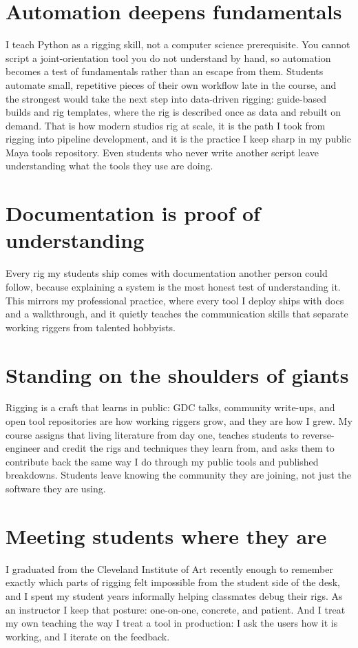 \documentclass[10pt,a4paper]{article}
\begin{document}
\section{Automation deepens fundamentals}
I teach Python as a rigging skill, not a computer science prerequisite. You cannot script a joint-orientation tool you do not understand by hand, so automation becomes a test of fundamentals rather than an escape from them. Students automate small, repetitive pieces of their own workflow late in the course, and the strongest would take the next step into data-driven rigging: guide-based builds and rig templates, where the rig is described once as data and rebuilt on demand. That is how modern studios rig at scale, it is the path I took from rigging into pipeline development, and it is the practice I keep sharp in my public Maya tools repository. Even students who never write another script leave understanding what the tools they use are doing.

\section{Documentation is proof of understanding}
Every rig my students ship comes with documentation another person could follow, because explaining a system is the most honest test of understanding it. This mirrors my professional practice, where every tool I deploy ships with docs and a walkthrough, and it quietly teaches the communication skills that separate working riggers from talented hobbyists.

\section{Standing on the shoulders of giants}
Rigging is a craft that learns in public: GDC talks, community write-ups, and open tool repositories are how working riggers grow, and they are how I grew. My course assigns that living literature from day one, teaches students to reverse-engineer and credit the rigs and techniques they learn from, and asks them to contribute back the same way I do through my public tools and published breakdowns. Students leave knowing the community they are joining, not just the software they are using.

\section{Meeting students where they are}
I graduated from the Cleveland Institute of Art recently enough to remember exactly which parts of rigging felt impossible from the student side of the desk, and I spent my student years informally helping classmates debug their rigs. As an instructor I keep that posture: one-on-one, concrete, and patient. And I treat my own teaching the way I treat a tool in production: I ask the users how it is working, and I iterate on the feedback.
\end{document}
